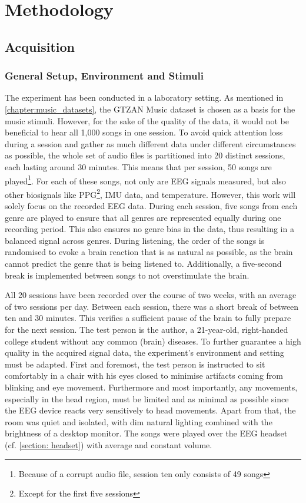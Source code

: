 \chapter{Methodology}\label{chapter:methodology}
\acresetall
  \section{Acquisition}
    \subsection{General Setup, Environment and Stimuli}
    The experiment has been conducted in a laboratory setting. As mentioned in \autoref{chapter:music_datasets}, the GTZAN Music dataset is chosen as a basis for the music stimuli. However, for the sake of the quality of the data, it would not be beneficial to hear all 1,000 songs in one session. To avoid quick attention loss during a session and gather as much different data under different circumstances as possible, the whole set of audio files is partitioned into 20 distinct sessions, each lasting around 30 minutes. This means that per session, 50 songs are played\footnote{Because of a corrupt audio file, session ten only consists of 49 songs}. For each of these songs, not only are \ac{EEG} signals measured, but also other biosignals like \ac{PPG}\footnote{Except for the first five sessions}, \ac{IMU} data, and temperature. However, this work will solely focus on the recorded \ac{EEG} data. During each session, five songs from each genre are played to ensure that all genres are represented equally during one recording period. This also ensures no genre bias in the data, thus resulting in a balanced signal across genres. During listening, the order of the songs is randomised to evoke a brain reaction that is as natural as possible, as the brain cannot predict the genre that is being listened to. Additionally, a five-second break is implemented between songs to not overstimulate the brain. \par
    All 20 sessions have been recorded over the course of two weeks, with an average of two sessions per day. Between each session, there was a short break of between ten and 30 minutes. This verifies a sufficient pause of the brain to fully prepare for the next session. The test person is the author, a 21-year-old, right-handed college student without any common (brain) diseases. To further guarantee a high quality in the acquired signal data, the experiment's environment and setting must be adapted. First and foremost, the test person is instructed to sit comfortably in a chair with his eyes closed to minimise artifacts coming from blinking and eye movement. Furthermore and most importantly, any movements, especially in the head region, must be limited and as minimal as possible since the \ac{EEG} device reacts very sensitively to head movements. Apart from that, the room was quiet and isolated, with dim natural lighting combined with the brightness of a desktop monitor. The songs were played over the \ac{EEG} headset (cf. \autoref{section: headset}) with average and constant volume.

